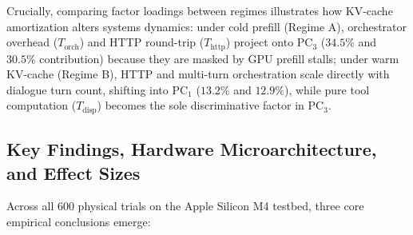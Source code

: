 \documentclass[11pt,a4paper]{article}
\begin{document}
Crucially, comparing factor loadings between regimes illustrates how KV-cache amortization alters systems dynamics: under cold prefill (Regime A), orchestrator overhead ($T_{\text{orch}}$) and HTTP round-trip ($T_{\text{http}}$) project onto $\text{PC}_3$ ($34.5\%$ and $30.5\%$ contribution) because they are masked by GPU prefill stalls; under warm KV-cache (Regime B), HTTP and multi-turn orchestration scale directly with dialogue turn count, shifting into $\text{PC}_1$ ($13.2\%$ and $12.9\%$), while pure tool computation ($T_{\text{disp}}$) becomes the sole discriminative factor in $\text{PC}_3$.

\subsection{Key Findings, Hardware Microarchitecture, and Effect Sizes}
Across all 600 physical trials on the Apple Silicon M4 testbed, three core empirical conclusions emerge:
\end{document}
